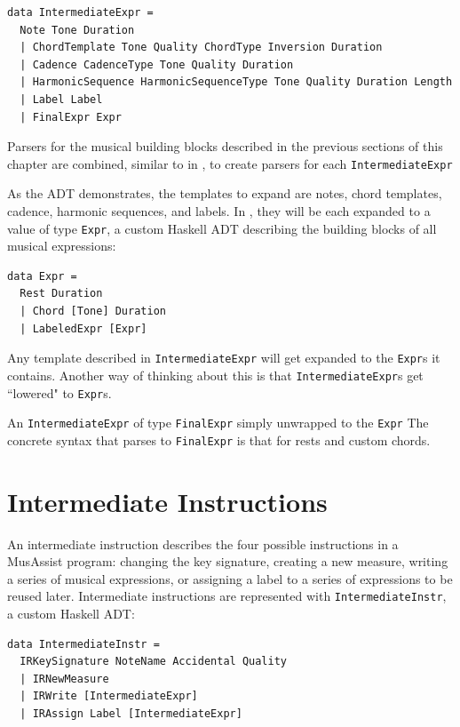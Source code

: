 \documentclass{report}
\begin{document}
\begin{verbatim}
data IntermediateExpr = 
  Note Tone Duration
  | ChordTemplate Tone Quality ChordType Inversion Duration
  | Cadence CadenceType Tone Quality Duration
  | HarmonicSequence HarmonicSequenceType Tone Quality Duration Length 
  | Label Label
  | FinalExpr Expr
\end{verbatim}

Parsers for the musical building blocks described in the previous sections of this chapter are combined, similar to in , to create parsers for each \verb.IntermediateExpr.

As the ADT demonstrates, the templates to expand are notes, chord templates, cadence, harmonic sequences, and labels. In , they will be each expanded to a value of type \verb.Expr., a custom Haskell ADT describing the building blocks of all musical expressions:

\begin{verbatim}
data Expr = 
  Rest Duration
  | Chord [Tone] Duration
  | LabeledExpr [Expr]
\end{verbatim}

Any template described in \verb.IntermediateExpr. will get expanded to the \verb.Expr.s it contains. Another way of thinking about this is that \verb.IntermediateExpr.s get ``lowered" to \verb.Expr.s.

An \verb.IntermediateExpr. of type \verb.FinalExpr. simply unwrapped to the \verb.Expr. The concrete syntax that parses to \verb.FinalExpr. is that for rests and custom chords. 

\section{Intermediate Instructions}

An intermediate instruction describes the four possible instructions in a MusAssist program: changing the key signature, creating a new measure, writing a series of musical expressions, or assigning a label to a series of expressions to be reused later. Intermediate instructions are represented with \verb.IntermediateInstr., a custom Haskell ADT:

\begin{verbatim}
data IntermediateInstr = 
  IRKeySignature NoteName Accidental Quality
  | IRNewMeasure
  | IRWrite [IntermediateExpr]
  | IRAssign Label [IntermediateExpr]
\end{verbatim}
\end{document}
